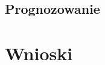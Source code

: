 \documentclass[11pt]{article}
\begin{document}
\newpage

\subsection{Prognozowanie}



\section{Wnioski}

\clearpage

\listoffigures
\end{document}
